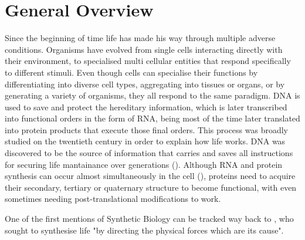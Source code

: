 \chapter{General Overview}

Since the beginning of time life has made his way through multiple adverse
conditions. Organisms have evolved from single cells interacting directly with
their environment, to specialised multi cellular entities that respond
specifically to different stimuli. Even though cells can specialise their
functions by differentiating into diverse cell types, aggregating into tissues
or organs, or by generating a variety of organisms, they all respond to the same
paradigm. DNA is used to save and protect the hereditary information, which is
later transcribed into functional orders in the form of RNA, being most of the
time later translated into protein products that execute those final orders.
This process was broadly studied on the twentieth century in order to explain
how life works. DNA was discovered to be the source of information that carries
and saves all instructions for securing life mantainance over generations
(\cite{watson1953molecular}). Although RNA and protein synthesis can occur
almost simultaneously in the cell  (\cite{miller1970visualization}), proteins
need to acquire their secondary, tertiary or quaternary structure to become
functional, with even sometimes needing post-translational modifications to
work.  


One of the first mentions of Synthetic Biology can be tracked way back to \cite{leduc1912biologie}, who sought to synthesise life "by directing the physical forces which are its cause".


